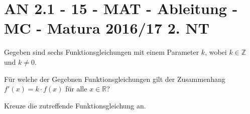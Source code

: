 \section{AN 2.1 - 15 - MAT - Ableitung - MC - Matura 2016/17 2. NT}

\begin{beispiel}{1} %
Gegeben sind sechs Funktionsgleichungen mit einem Parameter $k$, wobei $k \in \mathbb Z$ und $k \neq 0$. \leer

Für welche der Gegebnen Funktionsgleichungen gilt der Zusammenhang $f'(x)=k\cdot f(x)$ für alle $x \in \mathbb R$?

Kreuze die zutreffende Funktionsgleichung an.

\end{beispiel}